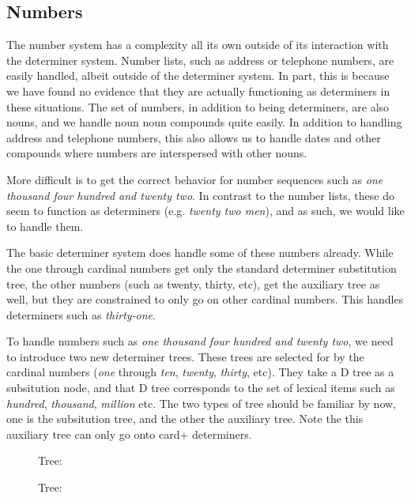 \subsection{Numbers}

The number system has a complexity all its own outside of its interaction with
the determiner system.  Number lists, such as address or telephone numbers, are
easily handled, albeit outside of the determiner system.  In part, this is
because we have found no evidence that they are actually functioning as
determiners in these situations.  The set of numbers, in addition to being
determiners, are also nouns, and we handle noun noun compounds quite easily.
In addition to handling address and telephone numbers, this also allows us to
handle dates and other compounds where numbers are interspersed with other nouns.

More difficult is to get the correct behavior for number sequences
such as {\it one
thousand four hundred and twenty two}.  In contrast to the number lists, these
do seem to function as determiners (e.g. {\it twenty two men\/}), and as such, we would like
to handle them. 

The basic determiner system does handle some of these numbers already.  While
the one through cardinal numbers get only the standard determiner substitution
tree, the other numbers (such as twenty, thirty, etc), get the auxiliary tree
as well, but they are constrained to only go on other cardinal numbers.  This
handles determiners such as {\it thirty-one}.  

To handle numbers such as {\it one thousand four hundred and twenty two}, we need
to introduce two new determiner trees.  These trees are selected for by the
cardinal numbers ({\it one\/} through {\it ten}, {\it twenty}, {\it thirty}, etc).  They take a D
tree as a subsitution node, and that D tree corresponds to the set of lexical
items such as {\it hundred}, {\it thousand}, {\it million\/} etc.  The two types of tree
should be familiar by now, one is the subsitution tree, and the other the
auxiliary tree.  Note the this auxiliary tree can only go onto card+
determiners.

\begin{figure}[ht]
\centering
{}
\caption{ Tree:  }
\end{figure}

\begin{figure}[ht]
\centering
{}
\caption{ Tree: }
\end{figure}

